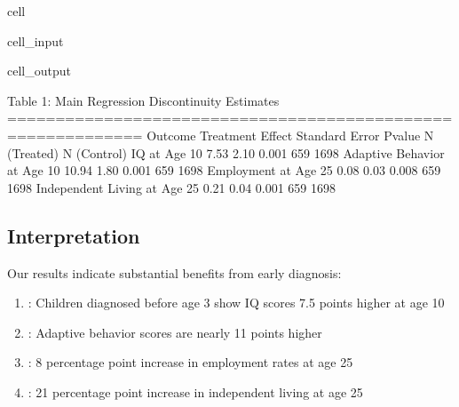 \documentclass[letterpaper,10pt,english]{jupyterBook}
\begin{document}
\begin{sphinxuseclass}{cell}
\begin{sphinxVerbatimInput}
\begin{sphinxuseclass}{cell_input}
\end{sphinxuseclass}\end{sphinxVerbatimInput}
\begin{sphinxVerbatimOutput}

\begin{sphinxuseclass}{cell_output}
\begin{sphinxVerbatim}[commandchars=\\\{\}]
Table 1: Main Regression Discontinuity Estimates
============================================================
                     Outcome  Treatment Effect  Standard Error  P\PYGZhy{}value  N (Treated)  N (Control)
                IQ at Age 10              7.53            2.10    0.001          659         1698
 Adaptive Behavior at Age 10             10.94            1.80    0.001          659         1698
        Employment at Age 25              0.08            0.03    0.008          659         1698
Independent Living at Age 25              0.21            0.04    0.001          659         1698
\end{sphinxVerbatim}

\end{sphinxuseclass}\end{sphinxVerbatimOutput}

\end{sphinxuseclass}

\subsection{Interpretation}
\label{\detokenize{results:interpretation}}
\sphinxAtStartPar
Our results indicate substantial benefits from early diagnosis:
\begin{enumerate}
%
\item {} 
\sphinxAtStartPar
{}: Children diagnosed before age 3 show IQ scores 7.5 points higher at age 10

\item {} 
\sphinxAtStartPar
{}: Adaptive behavior scores are nearly 11 points higher

\item {} 
\sphinxAtStartPar
{}: 8 percentage point increase in employment rates at age 25

\item {} 
\sphinxAtStartPar
{}: 21 percentage point increase in independent living at age 25

\end{enumerate}
\end{document}
